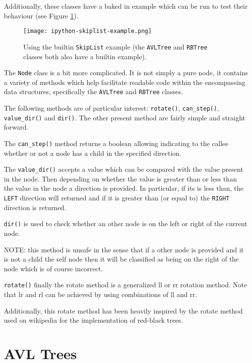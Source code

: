 \documentclass[article]{uom-coursework}
\begin{document}
Additionally, these classes have a baked in example which can be
run to test their behaviour (see Figure \ref{fig:example}).

\begin{figure}[H]
\centering
\texttt{[image: ipython-skiplist-example.png]}
\caption{Using the builtin \texttt{SkipList} example (the
\texttt{AVLTree} and \texttt{RBTree} classes both also have a
builtin example).}
\label{fig:example}
\end{figure}

The \texttt{Node} class is a bit more complicated. It is not
simply a pure node, it contains a variety of methods which help
facilitate readable code within the encompassing data
structures, specifically the \texttt{AVLTree} and
\texttt{RBTree} classes.

The following methods are of particular interest:
\texttt{rotate()}, \texttt{can\_step()}, \texttt{value\_dir()}
and \texttt{dir()}. The other present method are fairly simple
and straight forward.

The \texttt{can\_step()} method returns a boolean allowing
indicating to the callee whether or not a node has a child in
the specified direction.

The \texttt{value\_dir()} accepts a value which can be compared
with the value present in the node. Then depending on whether
the value is greater than or less than the value in the node a
direction is provided. In particular, if its is less than, the
\texttt{LEFT} direction will returned and if it is greater than
(or equal to) the \texttt{RIGHT} direction is returned.

\texttt{dir()} is used to check whether an other node is on the
left or right of the current node.

NOTE: this method is unsafe in the
sense that if a other node is provided and it is not a child the
self node then it will be classified as being on the right of
the node which is of course
incorrect.


\texttt{rotate()} finally the rotate
method is a generalized ll or rr
rotation method. Note that lr and
rl can be achieved by using combinations
of ll and rr.

Additionally, this rotate method has been heavily
inspired by the rotate method used on
wikipedia for the implementation
of red-black trees.


\section{AVL Trees}
\end{document}
